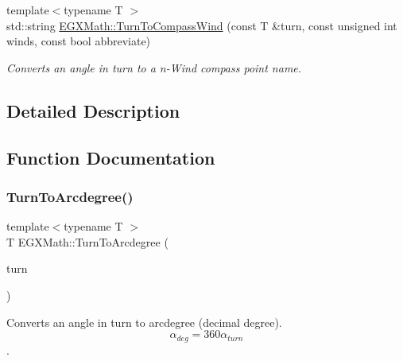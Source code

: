 \begin{DoxyCompactItemize}
{\footnotesize template$<$typename T $>$ }\\std\+::string \mbox{\hyperlink{group___e_g_x_math-_angle_conversions-_turn_gaea42f973566f770cc3552831717f525e}{E\+G\+X\+Math\+::\+Turn\+To\+Compass\+Wind}} (const T \&turn, const unsigned int winds, const bool abbreviate)
\begin{DoxyCompactList}\small\item\em Converts an angle in turn to a n-\/\+Wind compass point name. \end{DoxyCompactList}\end{DoxyCompactItemize}


\subsection{Detailed Description}


\subsection{Function Documentation}
\mbox{\label{group___e_g_x_math-_angle_conversions-_turn_ga7bdc3a81ce316dd47b1a3179489fa195}} 
\subsubsection{\texorpdfstring{Turn\+To\+Arcdegree()}{TurnToArcdegree()}}
{\footnotesize\ttfamily template$<$typename T $>$ \\
T E\+G\+X\+Math\+::\+Turn\+To\+Arcdegree (\begin{DoxyParamCaption}\item[{const T \&}]{turn }\end{DoxyParamCaption})}



Converts an angle in turn to arcdegree (decimal degree). \[\alpha_{deg}=360\alpha_{turn}\]. 

